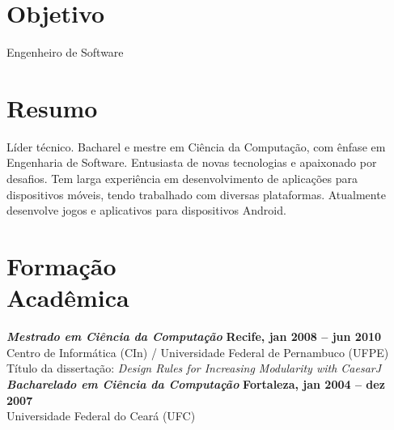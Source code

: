 \documentclass[margin, 10pt]{res} %
\begin{document}
\begin{resume}

 \vspace{-0.05in}
\section{Objetivo}  

Engenheiro de Software

 
\section{Resumo}  

Líder técnico. Bacharel e mestre em Ciência da Computação, com ênfase em Engenharia de Software. Entusiasta de novas tecnologias e apaixonado por desafios. Tem larga experiência em desenvolvimento de aplicações para dispositivos móveis, tendo trabalhado com diversas plataformas. Atualmente desenvolve jogos e aplicativos para dispositivos Android.


\section{Formação \\ Acadêmica}

{\sl\bf Mestrado em Ciência da Computação} \hfill {\bf Recife, jan 2008 -- jun 2010} \\
Centro de Informática (CIn) / Universidade Federal de Pernambuco (UFPE) \\
Título da dissertação: {\sl Design Rules for Increasing Modularity with CaesarJ}
\vspace{0.1in}
\\{\sl\bf Bacharelado em Ciência da Computação} \hfill {\bf Fortaleza, jan 2004 -- dez 2007} \\
Universidade Federal do Ceará (UFC)  
 

\end{resume}
\end{document}
